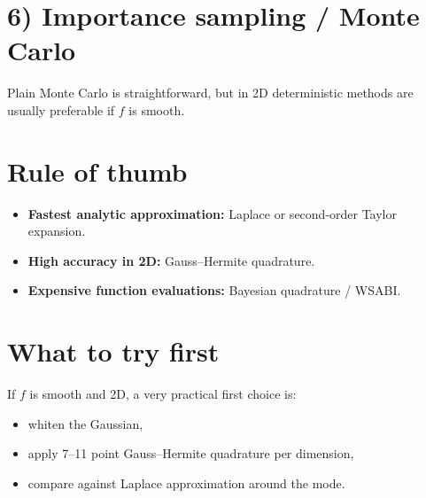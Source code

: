 \documentclass{article}
\begin{document}
\section*{6) Importance sampling / Monte Carlo}
Plain Monte Carlo is straightforward, but in 2D deterministic methods are usually preferable if \(f\) is smooth.

\section*{Rule of thumb}
\begin{itemize}
  \item \textbf{Fastest analytic approximation:} Laplace or second-order Taylor expansion.
  \item \textbf{High accuracy in 2D:} Gauss--Hermite quadrature.
  \item \textbf{Expensive function evaluations:} Bayesian quadrature / WSABI.
\end{itemize}

\section*{What to try first}
If \(f\) is smooth and 2D, a very practical first choice is:
\begin{itemize}
  \item whiten the Gaussian,
  \item apply 7--11 point Gauss--Hermite quadrature per dimension,
  \item compare against Laplace approximation around the mode.
\end{itemize}
\end{document}
